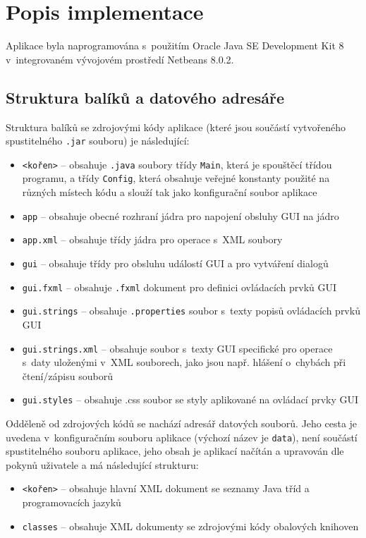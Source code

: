 \documentclass[czech,BP]{thesiskiv}
\begin{document}
\section{Popis implementace}
Aplikace byla naprogramována s~použitím Oracle Java SE Development Kit 8 v~integrovaném vývojovém prostředí Netbeans 8.0.2.

\subsection{Struktura balíků a datového adresáře}
Struktura balíků se zdrojovými kódy aplikace (které jsou součástí vytvořeného spustitelného \texttt{.jar} souboru) je následující:
\begin{itemize}
\item{\texttt{<kořen>} -- obsahuje \texttt{.java} soubory třídy \texttt{Main}, která je spouštěcí třídou programu, a třídy \texttt{Config}, která obsahuje veřejné konstanty použité na různých místech kódu a slouží tak jako konfigurační soubor aplikace}
\item{\texttt{app} -- obsahuje obecné rozhraní jádra pro napojení obsluhy GUI na jádro}
\item{\texttt{app.xml} -- obsahuje třídy jádra pro operace s~XML soubory}
\item{\texttt{gui} -- obsahuje třídy pro obsluhu událostí GUI a pro vytváření dialogů}
\item{\texttt{gui.fxml} -- obsahuje \texttt{.fxml} dokument pro definici ovládacích prvků GUI}
\item{\texttt{gui.strings} --  obsahuje \texttt{.properties} soubor s~texty popisů ovládacích prvků GUI}
\item{\texttt{gui.strings.xml} -- obsahuje soubor s~texty GUI specifické pro operace s~daty uloženými v~XML souborech, jako jsou např. hlášení o~chybách při čtení/zápisu souborů}
\item{\texttt{gui.styles} -- obsahuje {.css} soubor se styly aplikované na ovládací prvky GUI}
\end{itemize}

\noindent
Odděleně od zdrojových kódů se nachází adresář datových souborů. Jeho cesta je uvedena v~konfiguračním souboru aplikace (výchozí název je \texttt{data}), není součástí spustitelného souboru aplikace, jeho obsah je aplikací načítán a upravován dle pokynů uživatele a má následující strukturu:
\begin{itemize}
\item{\texttt{<kořen>} -- obsahuje hlavní XML dokument se seznamy Java tříd a programovacích jazyků}
\item{\texttt{classes} -- obsahuje XML dokumenty se zdrojovými kódy obalových knihoven}
\end{itemize}
\end{document}
